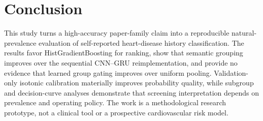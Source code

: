 \documentclass[conference,10pt]{IEEEtran}
\begin{document}
\section{Conclusion}
This study turns a high-accuracy paper-family claim into a reproducible natural-prevalence evaluation of self-reported heart-disease history classification. The results favor HistGradientBoosting for ranking, show that semantic grouping improves over the sequential CNN--GRU reimplementation, and provide no evidence that learned group gating improves over uniform pooling. Validation-only isotonic calibration materially improves probability quality, while subgroup and decision-curve analyses demonstrate that screening interpretation depends on prevalence and operating policy. The work is a methodological research prototype, not a clinical tool or a prospective cardiovascular risk model.

\balance


\end{document}
